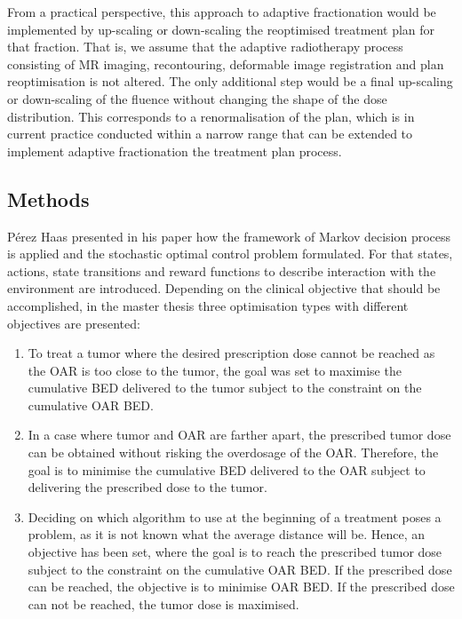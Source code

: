 \documentclass[\relativeRoot/ada.tex]{subfiles}
\begin{document}
From a practical perspective, this approach to adaptive fractionation would be implemented by up-scaling or down-scaling the reoptimised treatment plan for that fraction. That is, we assume that the adaptive radiotherapy process consisting of MR imaging, recontouring, deformable image registration and plan reoptimisation is not altered. The only additional step would be a final up-scaling or down-scaling of the fluence without changing the shape of the dose distribution. This corresponds to a renormalisation of the plan, which is in current practice conducted within a narrow range that can be extended to implement adaptive fractionation the treatment plan process.

\subsection{Methods}

Pérez Haas \cite{perezhaas_adaptive} presented in his paper how the framework of Markov decision process is applied and the stochastic optimal control problem formulated. For that states, actions, state transitions and reward functions to describe interaction with the environment are introduced. Depending on the clinical objective that should be accomplished, in the master thesis \cite{perezhaas_master} three optimisation types with different objectives are presented:
\begin{enumerate}
    \item To treat a tumor where the desired prescription dose cannot be reached as the OAR is too close to the tumor, the goal was set to maximise the cumulative BED delivered to the tumor subject to the constraint on the cumulative OAR BED.
    \item In a case where tumor and OAR are farther apart, the prescribed tumor dose can be obtained without risking the overdosage of the OAR. Therefore, the goal is to minimise the cumulative BED delivered to the OAR subject to delivering the prescribed dose to the tumor.
    \item Deciding on which algorithm to use at the beginning of a treatment poses a problem, as it is not known what the average distance will be. Hence, an objective has been set, where the goal is to reach the prescribed tumor dose subject to the constraint on the cumulative OAR BED. If the prescribed dose can be reached, the objective is to minimise OAR BED. If the prescribed dose can not be reached, the tumor dose is maximised.
\end{enumerate}
\end{document}
